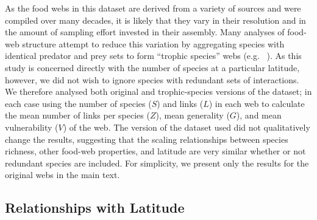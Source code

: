 \documentclass[12pt]{article}
\begin{document}


  As the food webs in this dataset are derived from a variety of sources and were compiled over many decades, it
  is likely that they vary in their resolution and in the amount of sampling effort invested in their assembly.
  Many analyses of food-web structure attempt to reduce this variation by aggregating species with identical predator and prey
  sets to form ``trophic species'' webs (e.g. ~\citep{Martinez1991,Vermaat2009,Dunne2004,Dunne2013}). As this study
  is concerned directly with the number of species at a particular latitude, however, we did not wish to ignore 
  species with redundant sets of interactions. We therefore analysed both original and trophic-species versions
  of the dataset; in each case using the number of species ($S$) and 
  links ($L$) in each web to calculate the mean number of links per species ($Z$), mean generality 
  ($G$), and mean vulnerability ($V$) of the web. 
  The version of the dataset used did not qualitatively change the results, suggesting that
  the scaling relationships between species richness, other food-web properties, and latitude are very 
  similar whether or not redundant species are included. For simplicity, we present only
  the results for the original webs in the main text. 


\subsection*{Relationships with Latitude}
\end{document}
